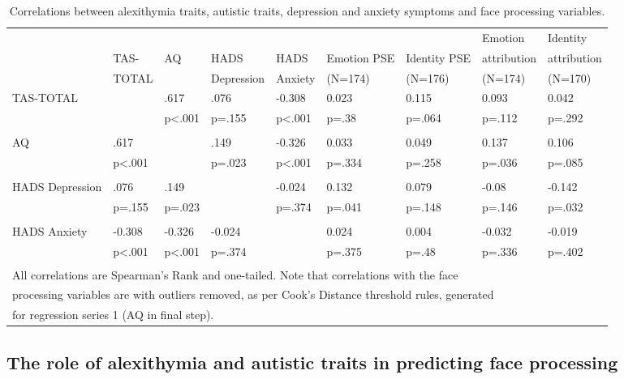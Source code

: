 \documentclass[
]{article}
\begin{document}
\begin{table}[H]

\caption{\label{tab:table2}Correlations between alexithymia traits, autistic traits, depression and anxiety symptoms and face processing variables.}
\centering
\fontsize{8}{10}\selectfont
\begin{tabular}[t]{lllllllll}
\toprule
 &  &  &  &  &  &  & Emotion & Identity\\
 & TAS- & AQ & HADS & HADS & Emotion PSE & Identity PSE & attribution & attribution\\
 & TOTAL &  & Depression & Anxiety & (N=174) & (N=176) & (N=174) & (N=170)\\
\midrule
TAS-TOTAL &  & .617 & .076 & -0.308 & 0.023 & 0.115 & 0.093 & 0.042\\
 &  & p<.001 & p=.155 & p<.001 & p=.38 & p=.064 & p=.112 & p=.292\\
\addlinespace
 &  &  &  &  &  &  &  \vphantom{2} & \\
AQ & .617 &  & .149 & -0.326 & 0.033 & 0.049 & 0.137 & 0.106\\
 & p<.001 &  & p=.023 & p<.001 & p=.334 & p=.258 & p=.036 & p=.085\\
 &  &  &  &  &  &  &  \vphantom{1} & \\
HADS Depression & .076 & .149 &  & -0.024 & 0.132 & 0.079 & -0.08 & -0.142\\
\addlinespace
 & p=.155 & p=.023 &  & p=.374 & p=.041 & p=.148 & p=.146 & p=.032\\
 &  &  &  &  &  &  &  & \\
HADS Anxiety & -0.308 & -0.326 & -0.024 &  & 0.024 & 0.004 & -0.032 & -0.019\\
 & p<.001 & p<.001 & p=.374 &  & p=.375 & p=.48 & p=.336 & p=.402\\
\bottomrule
\multicolumn{9}{l}{\textsuperscript{} All correlations are Spearman’s Rank and one-tailed. Note that correlations with the face}\\
\multicolumn{9}{l}{processing variables are with outliers removed, as per Cook’s Distance threshold rules, generated}\\
\multicolumn{9}{l}{for regression series 1 (AQ in final step).}\\
\end{tabular}
\end{table}

\hypertarget{the-role-of-alexithymia-and-autistic-traits-in-predicting-face-processing}{%
\subsection*{The role of alexithymia and autistic traits in predicting face processing}\label{the-role-of-alexithymia-and-autistic-traits-in-predicting-face-processing}}
\end{document}
